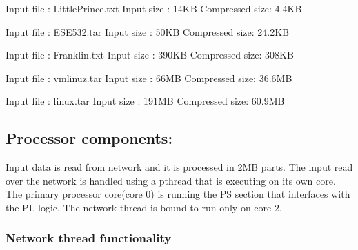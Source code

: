 \documentclass{article}
\begin{document}
    Input file : LittlePrince.txt       
    \newline
    Input size : 14KB
    \newline
    Compressed size: 4.4KB
    \newline\newline
    
    Input file : ESE532.tar       
    \newline
    Input size : 50KB
    \newline
    Compressed size: 24.2KB
    \newline\newline

    Input file : Franklin.txt       
    \newline
    Input size : 390KB
    \newline
    Compressed size: 308KB
    \newline\newline

    Input file : vmlinuz.tar       
    \newline
    Input size : 66MB
    \newline
    Compressed size: 36.6MB
    \newline\newline

    Input file : linux.tar       
    \newline
    Input size : 191MB
    \newline
    Compressed size: 60.9MB
    \newline\newline


\subsection{Processor components:}

Input data is read from network and it is processed in 2MB parts. 
\newline
The input read over the network is handled using a pthread that is executing on its own core. 
\newline
The primary processor core(core 0) is running the PS section that interfaces with the PL logic. 
\newline
The network thread is bound to run only on core 2. 
\newline

\subsubsection{Network thread functionality} 
\end{document}
